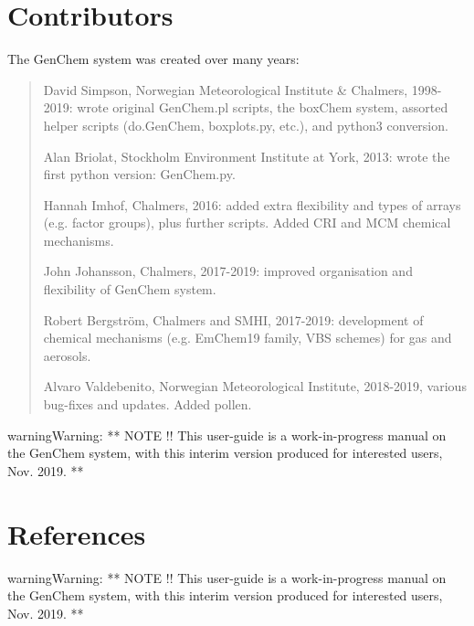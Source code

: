 \documentclass[a4paper,10pt,english]{sphinxmanual}
\begin{document}
\chapter{Contributors}
\label{\detokenize{GenChemDoc_contributors:contributors}}\label{\detokenize{GenChemDoc_contributors::doc}}
The GenChem system was created over many years:
\begin{quote}

David Simpson, Norwegian Meteorological Institute \& Chalmers,
1998-2019: wrote original GenChem.pl scripts, the
boxChem system, assorted helper scripts (do.GenChem, boxplots.py, etc.),
and python3 conversion.

Alan Briolat, Stockholm Environment Institute at York,  2013: wrote the
first python version: GenChem.py.

Hannah Imhof, Chalmers,  2016: added extra flexibility and types
of arrays (e.g. factor groups), plus further scripts.  Added
CRI and MCM chemical mechanisms.

John Johansson, Chalmers, 2017-2019: improved organisation and
flexibility of GenChem system.

Robert Bergström, Chalmers and SMHI, 2017-2019: development of
chemical mechanisms (e.g. EmChem19 family, VBS schemes) for gas and aerosols.

Alvaro Valdebenito, Norwegian Meteorological Institute, 2018-2019,
various bug-fixes and updates. Added pollen.
\end{quote}

\begin{sphinxadmonition}{warning}{Warning:}
**  NOTE !!
This user-guide is a work-in-progress manual on the GenChem system,
with this interim version produced for interested users, Nov. 2019.
**
\end{sphinxadmonition}


\chapter{References}
\label{\detokenize{GenChemDoc_refs:references}}\label{\detokenize{GenChemDoc_refs::doc}}
\begin{sphinxadmonition}{warning}{Warning:}
**  NOTE !!
This user-guide is a work-in-progress manual on the GenChem system,
with this interim version produced for interested users, Nov. 2019.
**
\end{sphinxadmonition}
\end{document}
